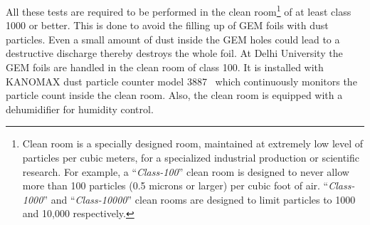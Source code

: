 
All these tests are required to be performed in the clean room\footnote{Clean room is a specially designed room, maintained at extremely low level of particles per cubic meters, for a specialized industrial production or scientific research. For example, a ``\textit{Class-100}'' clean room is designed to never allow more than 100 particles (0.5 microns or larger) per cubic foot of air. ``\textit{Class-1000}'' and ``\textit{Class-10000}'' clean rooms are designed to limit particles to 1000 and 10,000 respectively.} of at least class 1000 or better.
This is done to avoid the filling up of GEM foils with dust particles.
Even a small amount of dust inside the GEM holes could lead to a destructive discharge thereby destroys the whole foil.
At Delhi University the GEM foils are handled in the clean room of class 100. It is installed with KANOMAX dust particle counter model 3887~\cite{KANOMAX-dust-particle-counter} which continuously monitors the particle count inside the clean room.
Also, the clean room is equipped with a dehumidifier for humidity control.


